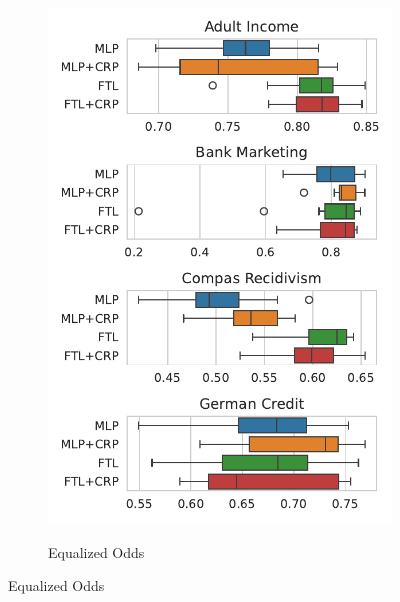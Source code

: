 \begin{figure}[!ht]
\begin{subfigure}{.32\linewidth}
    \includegraphics[width=1\linewidth]{images/boxplot_acc_opportunity_crp.pdf}
\end{subfigure}
\begin{subfigure}{.32\linewidth}
    \caption{Equalized Odds}
    \label{fig:boxplot_acc_odds_crp}

\end{subfigure}
\end{figure}
